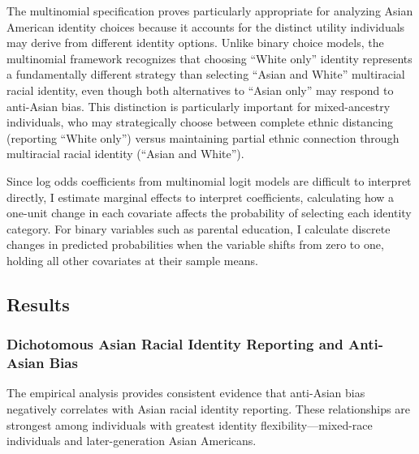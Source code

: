 The multinomial specification proves particularly appropriate for analyzing Asian American identity choices because it accounts for the distinct utility individuals may derive from different identity options. Unlike binary choice models, the multinomial framework recognizes that choosing ``White only'' identity represents a fundamentally different strategy than selecting ``Asian and White'' multiracial racial identity, even though both alternatives to ``Asian only'' may respond to anti-Asian bias. This distinction is particularly important for mixed-ancestry individuals, who may strategically choose between complete ethnic distancing (reporting ``White only'') versus maintaining partial ethnic connection through multiracial racial identity (``Asian and White'').

Since log odds coefficients from multinomial logit models are difficult to interpret directly, I estimate marginal effects to interpret coefficients, calculating how a one-unit change in each covariate affects the probability of selecting each identity category. For binary variables such as parental education, I calculate discrete changes in predicted probabilities when the variable shifts from zero to one, holding all other covariates at their sample means.

\subsection{Results}\label{sec:results}

\subsubsection{Dichotomous Asian Racial Identity Reporting and Anti-Asian Bias}\label{sec:results-dichotomous}

The empirical analysis provides consistent evidence that anti-Asian bias negatively correlates with Asian racial identity reporting. These relationships are strongest among individuals with greatest identity flexibility—mixed-race individuals and later-generation Asian Americans.

